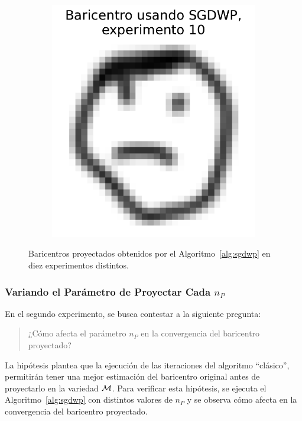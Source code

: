 \begin{figure}[H]
\begin{subfigure}[b]{0.17\textwidth}
        \label{fig:bar-SGDWP-exp-09}
    \end{subfigure}
    \hfill
    \begin{subfigure}[b]{0.17\textwidth}
        \centering
        \includegraphics[width=\textwidth]{img/sgdwp/bar-SGDWP-exp-10.pdf}
        \label{fig:bar-SGDWP-exp-10}
    \end{subfigure}
    \caption{Baricentros proyectados obtenidos por el Algoritmo~\ref{alg:sgdwp} en diez experimentos distintos.}
    \label{fig:bar-SGDWP-exp}
\end{figure}

\subsubsection{Variando el Parámetro de Proyectar Cada $n_P$}\label{sssec:sgdwp-variar-param}  %

En el segundo experimento, se busca contestar a la siguiente pregunta:
\begin{quotation}
    \centering
    ¿Cómo afecta el parámetro $n_P$ en la convergencia del baricentro proyectado?
\end{quotation}
La hipótesis plantea que la ejecución de las iteraciones del algoritmo ``clásico'', permitirán tener una mejor estimación del baricentro original antes de proyectarlo en la variedad $\operatorname{\mathcal{M}}$. Para verificar esta hipótesis, se ejecuta el Algoritmo~\ref{alg:sgdwp} con distintos valores de $n_P$ y se observa cómo afecta en la convergencia del baricentro proyectado.


